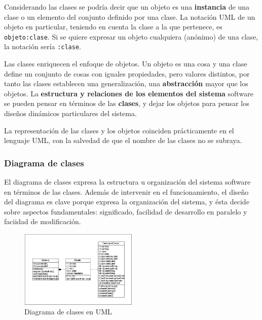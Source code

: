 \vspace{5mm}

Considerando las clases se podría decir que un objeto es una
\textbf{instancia} de una clase o un elemento del conjunto definido
por una clase. La notación UML de un objeto en particular, teniendo en
cuenta la clase a la que pertenece, es \texttt{objeto:clase}. Si se
quiere expresar un objeto cualquiera (anónimo) de una clase, la
notación sería \texttt{:clase}.

\vspace{5mm}

Las clases enriquecen el enfoque de objetos. Un objeto es una cosa y
una clase define un conjunto de cosas con iguales propiedades, pero
valores distintos, por tanto las clases establecen una generalización,
una \textbf{abstracción} mayor que los objetos. La \textbf{estructura y
relaciones de los elementos del sistema} software se pueden pensar en
términos de las \textbf{clases}, y dejar los objetos para pensar los diseños
dinámicos particulares del sistema.

\vspace{5mm}

La representación de las clases y los objetos coinciden prácticamente
en el lenguaje UML, con la salvedad de que el nombre de las clases no
se subraya.

\subsubsection{Diagrama de clases}
El diagrama de clases expresa la estructura u organización del sistema
software en términos de las clases. Además de intervenir en el
funcionamiento, el diseño del diagrama es clave porque expresa la
organización del sistema, y ésta decide sobre aspectos fundamentales:
significado, facilidad de desarrollo en paralelo y faciidad de modificación.

\begin{figure}[ht!]  \centering
  \includegraphics[width=0.5\textwidth]{images/fig33}
  \caption{Diagrama de clases en UML}
  \label{fig:33}
\end{figure}

